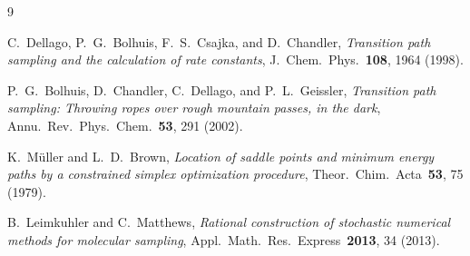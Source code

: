 \documentclass[11pt,a4paper]{article}
\begin{document}
\begin{thebibliography}{9}

C.~Dellago, P.~G.~Bolhuis, F.~S.~Csajka, and D.~Chandler,
\textit{Transition path sampling and the calculation of rate constants},
J.~Chem.~Phys.\ \textbf{108}, 1964 (1998).

P.~G.~Bolhuis, D.~Chandler, C.~Dellago, and P.~L.~Geissler,
\textit{Transition path sampling: Throwing ropes over rough mountain passes,
in the dark},
Annu.~Rev.~Phys.~Chem.\ \textbf{53}, 291 (2002).

K.~M\"{u}ller and L.~D.~Brown,
\textit{Location of saddle points and minimum energy paths by a constrained
simplex optimization procedure},
Theor.~Chim.~Acta\ \textbf{53}, 75 (1979).

B.~Leimkuhler and C.~Matthews,
\textit{Rational construction of stochastic numerical methods for molecular
sampling},
Appl.~Math.~Res.~Express\ \textbf{2013}, 34 (2013).

\end{thebibliography}
\end{document}
